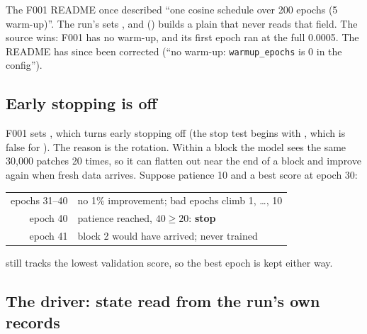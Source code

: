 \begin{sourcenote}[: no warm-up]
The F001 README once described ``one cosine schedule over 200 epochs (5 warm-up)''. The run's  sets
, and 
() builds a plain  that never reads that field. The
source wins: F001 has no warm-up, and its first epoch ran at the full 0.0005. The README has since been corrected (``no
warm-up: \texttt{warmup\_epochs} is 0 in the config'').
\end{sourcenote}


\subsection{Early stopping is off}

F001 sets , which turns early stopping off (the stop test begins with
, which is false for ). The reason is the rotation. Within a block the model
sees the same 30,000 patches 20 times, so it can flatten out near the end of a block and improve again when fresh data
arrives. Suppose patience 10 and a best score at epoch 30:
\begin{center}
\begin{tabular}{rl}
\toprule
epochs 31--40 & no 1\% improvement; bad epochs climb 1, \dots, 10\\
epoch 40 & patience reached, $40 \ge 20$: \textbf{stop}\\
epoch 41 & block 2 would have arrived; never trained\\
\bottomrule
\end{tabular}
\end{center}
 still tracks the lowest validation score, so the best epoch is kept either way.

\subsection{The driver: state read from the run's own records}

